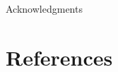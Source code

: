 \documentclass[aps,prd,amsmath,floats,floatfix, twocolumn,
superscriptaddress,nofootinbib,showpacs]{revtex4-1}
\begin{document}
\begin{acknowledgments}
Acknowledgments
\end{acknowledgments}

\section*{References}

\end{document}
